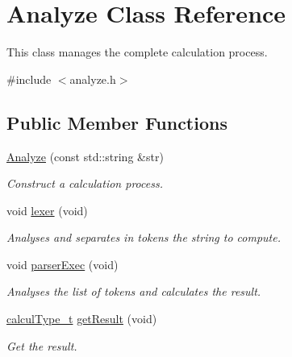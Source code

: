 \hypertarget{class_analyze}{}\section{Analyze Class Reference}
\label{class_analyze}


This class manages the complete calculation process.  




{\ttfamily \#include $<$analyze.\+h$>$}

\subsection*{Public Member Functions}
\begin{DoxyCompactItemize}
\item 
\hyperlink{class_analyze_a373e5e79d15401c429b980f819ce76b3}{Analyze} (const std\+::string \&str)
\begin{DoxyCompactList}\small\item\em Construct a calculation process. \end{DoxyCompactList}\item 
\hypertarget{class_analyze_a1090a6b9655c4770707d65ee8ebc124a}{}void \hyperlink{class_analyze_a1090a6b9655c4770707d65ee8ebc124a}{lexer} (void)\label{class_analyze_a1090a6b9655c4770707d65ee8ebc124a}

\begin{DoxyCompactList}\small\item\em Analyses and separates in tokens the string to compute. \end{DoxyCompactList}\item 
\hypertarget{class_analyze_ae0c00996ea3ce2e87f6cdda0c8df7065}{}void \hyperlink{class_analyze_ae0c00996ea3ce2e87f6cdda0c8df7065}{parser\+Exec} (void)\label{class_analyze_ae0c00996ea3ce2e87f6cdda0c8df7065}

\begin{DoxyCompactList}\small\item\em Analyses the list of tokens and calculates the result. \end{DoxyCompactList}\item 
\hypertarget{class_analyze_a20765fccf3b534b55ee65bd79ae25a83}{}\hyperlink{mpfr_interface_8h_a993860352aef57b15399903c4475a608}{calcul\+Type\+\_\+t} \hyperlink{class_analyze_a20765fccf3b534b55ee65bd79ae25a83}{get\+Result} (void)\label{class_analyze_a20765fccf3b534b55ee65bd79ae25a83}

\begin{DoxyCompactList}\small\item\em Get the result. \end{DoxyCompactList}\end{DoxyCompactItemize}
